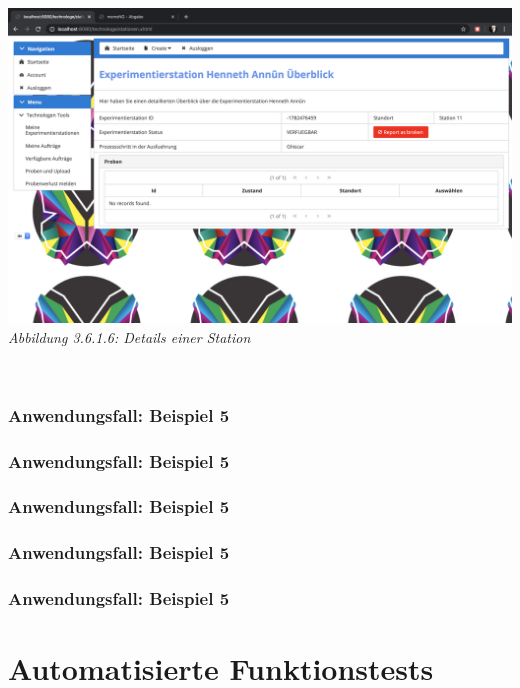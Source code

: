 \documentclass[enabledeprecatedfontcommands,fontsize=12pt,paper=a4,twoside]{scrartcl}
\begin{document}
 \hypertarget{sc3.6.1.6}{
\includegraphics[width=1\textwidth]{Screenshots/3616.png}
\textit{Abbildung 3.6.1.6: Details einer Station}
} \\


\subsubsection{Anwendungsfall: Beispiel 5}


\subsubsection{Anwendungsfall: Beispiel 5}


\subsubsection{Anwendungsfall: Beispiel 5}


\subsubsection{Anwendungsfall: Beispiel 5}


\subsubsection{Anwendungsfall: Beispiel 5}


\section{Automatisierte Funktionstests}
\end{document}
